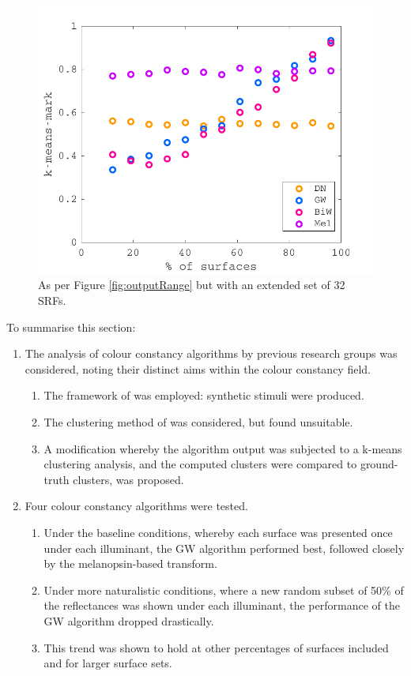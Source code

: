 \begin{figure}[htbp]
 \includegraphics[max width=\textwidth]{figs/comp/comparisonFourAlgos/outputRangeMore.pdf}
 \caption{As per Figure \ref{fig:outputRange} but with an extended set of 32 \glspl{SRF}.}
 \label{fig:outputRangeMore}
\end{figure} 

\bigskip
\noindent
To summarise this section:
\begin{enumerate}
    \item The analysis of colour constancy algorithms by previous research groups was considered, noting their distinct aims within the colour constancy field.
    \begin{enumerate}
        \item The framework of \citet{barnard_comparison_2002} was employed: synthetic stimuli were produced.
        \item The clustering method of \citet{forsyth_novel_1990} was considered, but found unsuitable.
        \item A modification whereby the algorithm output was subjected to a k-means clustering analysis, and the computed clusters were compared to ground-truth clusters, was proposed.
    \end{enumerate}
    \item Four colour constancy algorithms were tested.
    \begin{enumerate}
        \item Under the baseline conditions, whereby each surface was presented once under each illuminant, the \gls{GW} algorithm performed best, followed closely by the melanopsin-based transform.
        \item Under more naturalistic conditions, where a new random subset of 50\% of the reflectances was shown under each illuminant, the performance of the \gls{GW} algorithm dropped drastically.
        \item This trend was shown to hold at other percentages of surfaces included and for larger surface sets.
    \end{enumerate}
\end{enumerate}

